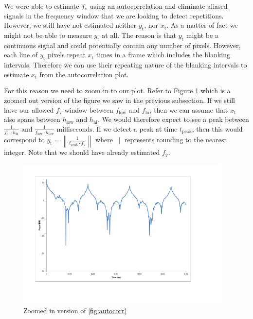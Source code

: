 \documentclass[a4paper,12pt,twoside,openright]{report}
\begin{document}
We were able to estimate $f_\text{v}$ using an autocorrelation and eliminate aliased signals in the frequency window that we are looking to detect repetitions. However, we still have not estimated neither $y_\text{t}$, nor $x_\text{t}$. As a matter of fact we might not be able to measure $y_\text{t}$ at all. The reason is that $y_\text{t}$ might be a continuous signal and could potentially contain any number of pixels. However, each line of $y_\text{t}$ pixels repeat $x_\text{t}$ times in a frame which includes the blanking intervals. Therefore we can use their repeating nature of the blanking intervals to estimate $x_\text{t}$ from the autocorrelation plot.

For this reason we need to zoom in to our plot. Refer to Figure \ref{fig:autocorr_zoomed} which is a zoomed out version of the figure we saw in the previous subsection. If we still have our allowed $f_\text{v}$ window between $f_\text{low}$ and $f_\text{hi}$, then we can assume that $x_\text{t}$ also spans between $h_\text{low}$ and $h_\text{hi}$. We would therefore expect to see a peak between $\frac{1}{f_\text{hi} \cdot h_\text{hi}}$ and $\frac{1}{f_\text{low} \cdot h_\text{low}}$ milliseconds. If we detect a peak at time $t_\text{peak}$, then this would correspond to $y_\text{t} = \left\| \frac{1}{t_\text{peak} \cdot f_\text{v}} \right\|$ where $\|$ represents rounding to the nearest integer. Note that we should have already estimated $f_\text{v}$.

\begin{figure}[h]
\centering
  \includegraphics[width=0.96\textwidth]{autocorr_zoomed}
  \caption{Zoomed in version of \ref{fig:autocorr}}
  \label{fig:autocorr_zoomed}
\end{figure}
\end{document}
